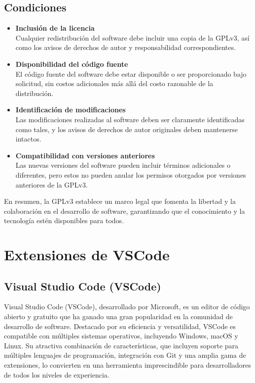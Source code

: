 \subsection{Condiciones}
\begin{itemize}
  \item \textbf{Inclusión de la licencia} \\
  Cualquier redistribución del software debe incluir una copia de la GPLv3, así como los avisos de derechos de autor y responsabilidad correspondientes.
  \item \textbf{Disponibilidad del código fuente} \\
  El código fuente del software debe estar disponible o ser proporcionado bajo solicitud, sin costos adicionales más allá del costo razonable de la distribución.
  \item \textbf{Identificación de modificaciones} \\
  Las modificaciones realizadas al software deben ser claramente identificadas como tales, y los avisos de derechos de autor originales deben mantenerse intactos.
  \item \textbf{Compatibilidad con versiones anteriores} \\
  Las nuevas versiones del software pueden incluir términos adicionales o diferentes, pero estos no pueden anular los permisos otorgados por versiones anteriores de la GPLv3.
\end{itemize}

En resumen, la GPLv3 establece un marco legal que fomenta la libertad y la colaboración en el desarrollo de software, garantizando que el conocimiento y la tecnología estén disponibles para todos.

\section{Extensiones de VSCode}
\subsection{Visual Studio Code (VSCode)}
Visual Studio Code (VSCode), desarrollado por Microsoft, es un editor de código abierto y gratuito que ha ganado una gran popularidad en la comunidad de desarrollo de software. Destacado por su eficiencia y versatilidad, VSCode es compatible con múltiples sistemas operativos, incluyendo Windows, macOS y Linux. Su atractiva combinación de características, que incluyen soporte para múltiples lenguajes de programación, integración con Git y una amplia gama de extensiones, lo convierten en una herramienta imprescindible para desarrolladores de todos los niveles de experiencia. \parencite{GarcíaDeZúñiga2023}

